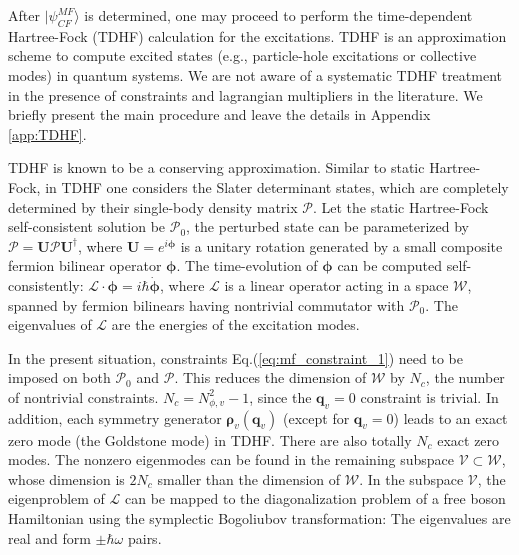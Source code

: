 After $|\psi^{MF}_{CF}\rangle$ is determined, one may proceed to perform the time-dependent Hartree-Fock (TDHF) calculation for the excitations. TDHF is an approximation scheme to compute excited states (e.g., particle-hole excitations or collective modes) in quantum systems. We are not aware of a systematic TDHF treatment in the presence of constraints and lagrangian multipliers in the literature. We briefly present the main procedure and leave the details in Appendix \ref{app:TDHF}.

TDHF is known to be a conserving approximation. Similar to static Hartree-Fock, in TDHF one considers the Slater determinant states, which are completely determined by their single-body density matrix $\boldsymbol{\mathcal P}$. Let the static Hartree-Fock self-consistent solution be $\boldsymbol{\mathcal P}_0$, the perturbed state can be parameterized by $\boldsymbol{\mathcal P}=\mathbf U\boldsymbol{\mathcal P}\mathbf U^\dagger$, where $\mathbf U=e^{i\boldsymbol{\phi}}$ is a unitary rotation generated by a small composite fermion bilinear operator $\boldsymbol{\phi}$. The time-evolution of $\boldsymbol{\phi}$ can be computed self-consistently: $\boldsymbol{\mathcal L}\cdot \boldsymbol{\phi}= i\hbar \dot{\boldsymbol{\phi}}$, where $\boldsymbol{\mathcal L}$ is a linear operator acting in a space $\boldsymbol{\mathcal W}$, spanned by fermion bilinears having nontrivial commutator with $\boldsymbol{\mathcal P}_0$. The eigenvalues of $\boldsymbol{\mathcal L}$ are the energies of the excitation modes.

In the present situation, constraints Eq.(\ref{eq:mf_constraint_1}) need to be imposed on both $\boldsymbol{\mathcal P}_0$ and $\boldsymbol{\mathcal P}$. This reduces the dimension of $\boldsymbol{\mathcal W}$ by $N_c$, the number of nontrivial constraints. $N_c=N_{\phi,v}^2-1$, since the $\mathbf q_v=0$ constraint is trivial. In addition, each symmetry generator $\boldsymbol{\rho}_v(\mathbf q_v)$ (except for $\mathbf q_v=0$) leads to an exact zero mode (the Goldstone mode) in TDHF. There are also totally $N_c$ exact zero modes. The nonzero eigenmodes can be found in the remaining subspace $\boldsymbol{\mathcal V}\subset \boldsymbol{\mathcal W}$, whose dimension is $2N_c$ smaller than the dimension of $\boldsymbol{\mathcal W}$. In the subspace $\boldsymbol{\mathcal V}$, the eigenproblem of $\boldsymbol{\mathcal L}$ can be mapped to the diagonalization problem of a free boson Hamiltonian using the symplectic Bogoliubov transformation: The eigenvalues are real and form $\pm\hbar\omega$ pairs.

